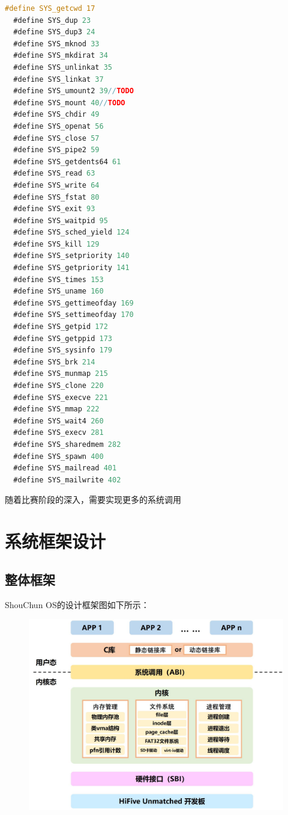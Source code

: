 \documentclass[UTF8,a4paper,10pt]{ctexart}
\begin{document}
\begin{lstlisting}[title=初赛系统调用,frame=trbl,language={C}]
  #define SYS_getcwd 17
  #define SYS_dup 23
  #define SYS_dup3 24
  #define SYS_mknod 33
  #define SYS_mkdirat 34
  #define SYS_unlinkat 35
  #define SYS_linkat 37
  #define SYS_umount2 39//TODO
  #define SYS_mount 40//TODO
  #define SYS_chdir 49
  #define SYS_openat 56
  #define SYS_close 57
  #define SYS_pipe2 59
  #define SYS_getdents64 61
  #define SYS_read 63
  #define SYS_write 64
  #define SYS_fstat 80
  #define SYS_exit 93
  #define SYS_waitpid 95
  #define SYS_sched_yield 124
  #define SYS_kill 129
  #define SYS_setpriority 140
  #define SYS_getpriority 141
  #define SYS_times 153
  #define SYS_uname 160
  #define SYS_gettimeofday 169
  #define SYS_settimeofday 170
  #define SYS_getpid 172
  #define SYS_getppid 173
  #define SYS_sysinfo 179
  #define SYS_brk 214
  #define SYS_munmap 215
  #define SYS_clone 220
  #define SYS_execve 221
  #define SYS_mmap 222
  #define SYS_wait4 260
  #define SYS_execv 281
  #define SYS_sharedmem 282
  #define SYS_spawn 400
  #define SYS_mailread 401
  #define SYS_mailwrite 402
\end{lstlisting}

随着比赛阶段的深入，需要实现更多的系统调用

\section{系统框架设计}

\subsection{整体框架}

ShouChun OS的设计框架图如下所示：

\begin{figure}[H]
  \centering
  \includegraphics[scale=0.5]{image/img01.jpg}
\end{figure}
\end{document}
